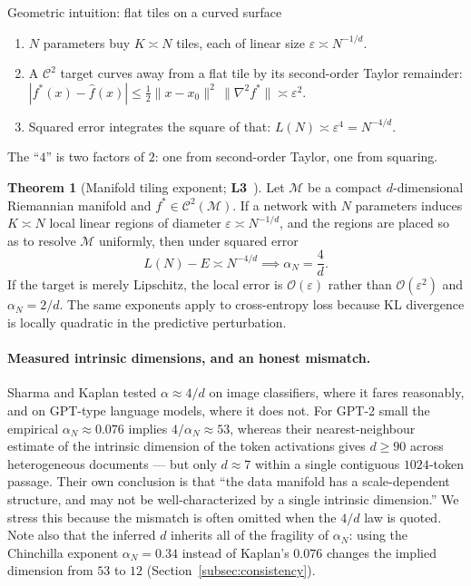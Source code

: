 \documentclass[11pt,a4paper]{article}
\theoremstyle{definition}
\newtheorem{theorem}{Theorem}[section]
\begin{document}
\begin{intuition}{Geometric intuition: flat tiles on a curved surface}
\begin{enumerate}[leftmargin=1.5em,nosep]
  \item $N$ parameters buy $K\asymp N$ tiles, each of linear size $\varepsilon\asymp N^{-1/d}$.
  \item A $\mathcal{C}^2$ target curves away from a flat tile by its second-order Taylor remainder:
  $|f^*(x)-\hat f(x)| \le \tfrac12\|x-x_0\|^2\,\|\nabla^2 f^*\| \asymp \varepsilon^2$.
  \item Squared error integrates the square of that: $L(N)\asymp \varepsilon^4 = N^{-4/d}$.
\end{enumerate}
The ``$4$'' is two factors of $2$: one from second-order Taylor, one from squaring.
\end{intuition}

\begin{theorem}[Manifold tiling exponent; \textbf{L3}~\cite{sharma2020neural}]
Let $\mathcal{M}$ be a compact $d$-dimensional Riemannian manifold and $f^*\in\mathcal{C}^2(\mathcal{M})$. If a network with $N$ parameters induces $K\asymp N$ local linear regions of diameter $\varepsilon\asymp N^{-1/d}$, and the regions are placed so as to resolve $\mathcal{M}$ uniformly, then under squared error
\begin{equation}
  \boxed{L(N) - E \asymp N^{-4/d} \implies \alpha_N = \frac{4}{d}} .
\end{equation}
If the target is merely Lipschitz, the local error is $\mathcal{O}(\varepsilon)$ rather than $\mathcal{O}(\varepsilon^2)$ and $\alpha_N = 2/d$. The same exponents apply to cross-entropy loss because KL divergence is locally quadratic in the predictive perturbation.
\end{theorem}

\paragraph{Measured intrinsic dimensions, and an honest mismatch.} Sharma and Kaplan tested $\alpha\approx 4/d$ on image classifiers, where it fares reasonably, and on GPT-type language models, where it does not. For GPT-2 small the empirical $\alpha_N\approx 0.076$ implies $4/\alpha_N\approx 53$, whereas their nearest-neighbour estimate of the intrinsic dimension of the token activations gives $d\ge 90$ across heterogeneous documents --- but only $d\approx 7$ within a single contiguous $1024$-token passage. Their own conclusion is that ``the data manifold has a scale-dependent structure, and may not be well-characterized by a single intrinsic dimension.'' We stress this because the mismatch is often omitted when the $4/d$ law is quoted. Note also that the inferred $d$ inherits all of the fragility of $\alpha_N$: using the Chinchilla exponent $\alpha_N=0.34$ instead of Kaplan's $0.076$ changes the implied dimension from $53$ to $12$ (Section~\ref{subsec:consistency}).
\end{document}
